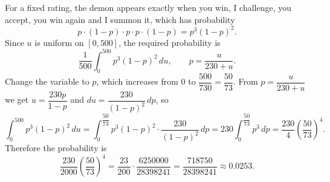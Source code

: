 For a fixed rating, the demon appears exactly when you win, I challenge, you accept, you win again and I summon it, which has probability
\[p\cdot(1-p)\cdot p\cdot p\cdot(1-p)=p^3(1-p)^2.\]
Since $u$ is uniform on $[0,500]$, the required probability is
\[\dfrac{1}{500}\int_0^{500}p^3(1-p)^2\,du,\qquad p=\dfrac{u}{230+u}.\]
Change the variable to $p$, which increases from $0$ to $\dfrac{500}{730}=\dfrac{50}{73}$. From $p=\dfrac{u}{230+u}$ we get $u=\dfrac{230p}{1-p}$ and $du=\dfrac{230}{(1-p)^2}\,dp$, so
\[\int_0^{500}p^3(1-p)^2\,du=\int_0^{\dfrac{50}{73}}p^3(1-p)^2\cdot\dfrac{230}{(1-p)^2}\,dp=230\int_0^{\dfrac{50}{73}}p^3\,dp=\dfrac{230}{4}\left(\dfrac{50}{73}\right)^4.\]
Therefore the probability is
\[\dfrac{230}{2000}\left(\dfrac{50}{73}\right)^4=\dfrac{23}{200}\cdot\dfrac{6250000}{28398241}=\boxed{\dfrac{718750}{28398241}}\approx0.0253.\]
